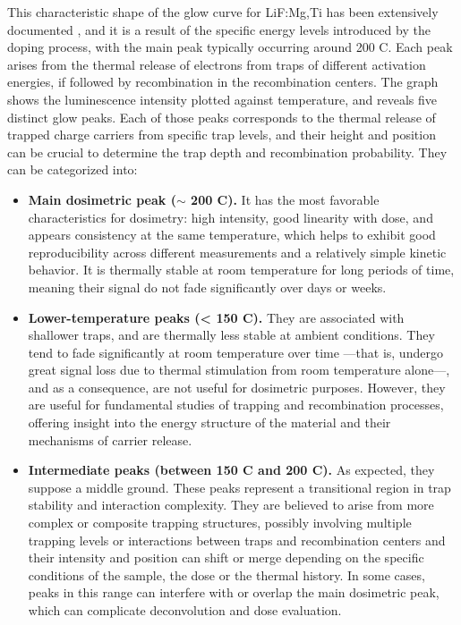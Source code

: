 This characteristic shape of the glow curve for LiF:Mg,Ti has been extensively documented \cite{mckeever_course_2022} \cite{benavente_LiF} \cite{massillon-jl_role_nodate}, and it is a result of the specific energy levels introduced by the doping process, with the main peak typically occurring around 200 \textdegree C. Each peak arises from the thermal release of electrons from traps of different activation energies, if followed by recombination in the recombination centers. The graph shows the luminescence intensity plotted against temperature, and reveals five distinct glow peaks. Each of those peaks corresponds to the thermal release of trapped charge carriers from specific trap levels, and their height and position can be crucial to determine the trap depth and recombination probability. They can be categorized into:

\begin{itemize}
  \item \textbf{Main dosimetric peak ($\sim$ 200 \textdegree C).} It has the most favorable characteristics for dosimetry: high intensity, good linearity with dose, and appears consistency at the same temperature, which helps to exhibit good reproducibility across different measurements and a relatively simple kinetic behavior. It is thermally stable at room temperature for long periods of time, meaning their signal do not fade significantly over days or weeks. 
  \item \textbf{Lower-temperature peaks (< 150 \textdegree C).} They are associated with shallower traps, and are thermally less stable at ambient conditions. They tend to fade significantly at room temperature over time ---that is, undergo great signal loss due to thermal stimulation from room temperature alone---, and as a consequence, are not useful for dosimetric purposes. However, they are useful for fundamental studies of trapping and recombination processes, offering insight into the energy structure of the material and their mechanisms of carrier release. 
  \item \textbf{Intermediate peaks (between 150 \textdegree C and 200 \textdegree C).} As expected, they suppose a middle ground. These peaks represent a transitional region in trap stability and interaction complexity. They are believed to arise from more complex or composite trapping structures, possibly involving multiple trapping levels or interactions between traps and recombination centers and their intensity and position can shift or merge depending on the specific conditions of the sample, the dose or the thermal history. In some cases, peaks in this range can interfere with or overlap the main dosimetric peak, which can complicate deconvolution and dose evaluation.
\end{itemize}
